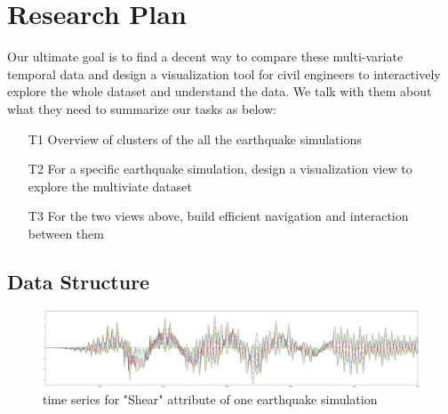 \section{Research Plan} %
\label{sec:vis}

Our ultimate goal is to find a decent way to compare these multi-variate temporal data and design a visualization tool for civil engineers to interactively explore the whole dataset and understand the data. We talk with them about what they need to summarize our tasks as below:
\begin{itemize}
	\item [T1] Overview of clusters of the all the earthquake simulations 
	\item [T2] For a specific earthquake simulation, design a visualization view to explore the multiviate dataset
	\item [T3] For the two views above, build efficient navigation and interaction between them 
\end{itemize} 


\subsection{Data Structure}
\label{sec:data}
\begin{figure}[h]
	\centering %
	\includegraphics[width=\columnwidth]{figs/eq} 
	\caption{time series for "Shear" attribute of one earthquake simulation}
	\label{fig:data}
\end{figure}

